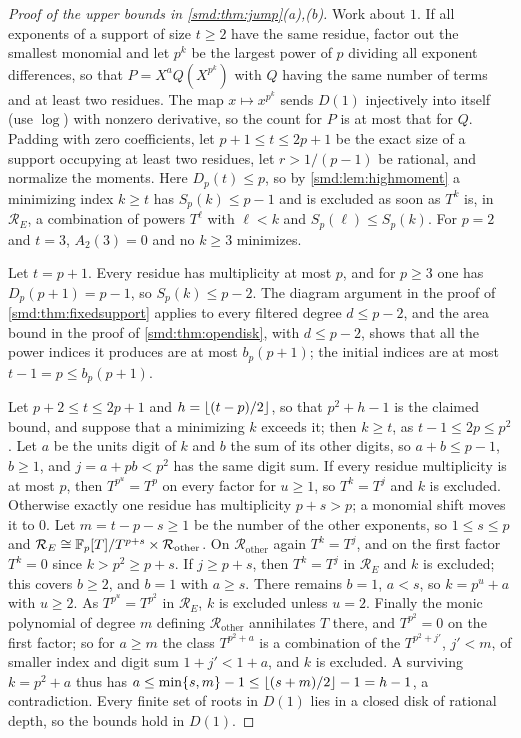\begin{proof}[Proof of the upper bounds in \cref{smd:thm:jump}(a),(b)]
Work about $1$. If all exponents of a support of size $t\ge2$ have the same residue, factor out
the smallest monomial and let $p^k$ be the largest power of $p$ dividing all exponent
differences, so that $P=X^aQ(X^{p^k})$ with $Q$ having the same number of terms and at least
two residues. The map $x\mapsto x^{p^k}$ sends $D(1)$ injectively into itself (use $\log$) with
nonzero derivative, so the count for $P$ is at most that for $Q$. Padding with zero
coefficients, let $p+1\le t\le2p+1$ be the exact size of a support occupying at least two
residues, let $r>1/(p-1)$ be rational, and normalize the moments. Here $D_p(t)\le p$, so by
\cref{smd:lem:highmoment} a minimizing index $k\ge t$ has $S_p(k)\le p-1$ and is excluded as
soon as $T^k$ is, in $\mathcal R_E$, a combination of powers $T^\ell$ with $\ell<k$ and
$S_p(\ell)\le S_p(k)$. For $p=2$ and $t=3$, $A_2(3)=0$ and no $k\ge3$ minimizes.

Let $t=p+1$. Every residue has multiplicity at most $p$, and for $p\ge3$ one has
$D_p(p+1)=p-1$, so $S_p(k)\le p-2$. The diagram argument in the proof of
\cref{smd:thm:fixedsupport} applies to every filtered degree $d\le p-2$, and the area bound in
the proof of \cref{smd:thm:opendisk}, with $d\le p-2$, shows that all the power indices it
produces are at most $b_p(p+1)$; the initial indices are at most $t-1=p\le b_p(p+1)$.

Let $p+2\le t\le2p+1$ and $h=\lfloor(t-p)/2\rfloor$, so that $p^2+h-1$ is the claimed bound, and
suppose that a minimizing $k$ exceeds it; then $k\ge t$, as $t-1\le2p\le p^2$. Let $a$ be the
units digit of $k$ and $b$ the sum of its other digits, so $a+b\le p-1$, $b\ge1$, and
$j=a+pb<p^2$ has the same digit sum. If every residue multiplicity is at most $p$, then
$T^{p^u}=T^p$ on every factor for $u\ge1$, so $T^k=T^j$ and $k$ is excluded. Otherwise exactly
one residue has multiplicity $p+s>p$; a monomial shift moves it to $0$. Let $m=t-p-s\ge1$ be the
number of the other exponents, so $1\le s\le p$ and
$\mathcal R_E\cong\mathbb{F}_p[T]/T^{p+s}\times\mathcal R_{\mathrm{other}}$. On
$\mathcal R_{\mathrm{other}}$ again $T^k=T^j$, and on the first factor $T^k=0$ since
$k>p^2\ge p+s$. If $j\ge p+s$, then $T^k=T^j$ in $\mathcal R_E$ and $k$ is excluded; this covers
$b\ge2$, and $b=1$ with $a\ge s$. There remains $b=1$, $a<s$, so $k=p^u+a$ with $u\ge2$. As
$T^{p^u}=T^{p^2}$ in $\mathcal R_E$, $k$ is excluded unless $u=2$. Finally the monic polynomial
of degree $m$ defining $\mathcal R_{\mathrm{other}}$ annihilates $T$ there, and $T^{p^2}=0$ on
the first factor; so for $a\ge m$ the class $T^{p^2+a}$ is a combination of the
$T^{p^2+j'}$, $j'<m$, of smaller index and digit sum $1+j'<1+a$, and $k$ is excluded. A
surviving $k=p^2+a$ thus has $a\le\min\{s,m\}-1\le\lfloor(s+m)/2\rfloor-1=h-1$, a contradiction.
Every finite set of roots in $D(1)$ lies in a closed disk of rational depth, so the bounds hold
in $D(1)$.
\end{proof}

